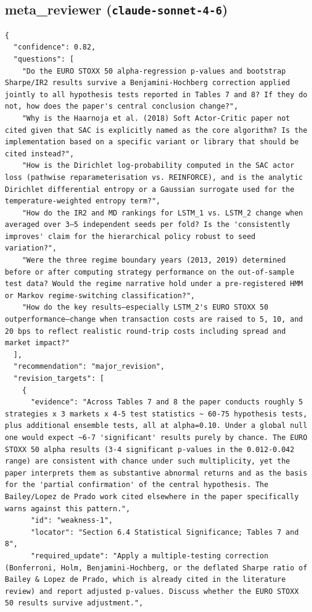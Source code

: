 \documentclass[11pt]{article}
\begin{document}
\subsection*{meta_reviewer (\texttt{claude-sonnet-4-6})}
\begin{verbatim}
{
  "confidence": 0.82,
  "questions": [
    "Do the EURO STOXX 50 alpha-regression p-values and bootstrap Sharpe/IR2 results survive a Benjamini-Hochberg correction applied jointly to all hypothesis tests reported in Tables 7 and 8? If they do not, how does the paper's central conclusion change?",
    "Why is the Haarnoja et al. (2018) Soft Actor-Critic paper not cited given that SAC is explicitly named as the core algorithm? Is the implementation based on a specific variant or library that should be cited instead?",
    "How is the Dirichlet log-probability computed in the SAC actor loss (pathwise reparameterisation vs. REINFORCE), and is the analytic Dirichlet differential entropy or a Gaussian surrogate used for the temperature-weighted entropy term?",
    "How do the IR2 and MD rankings for LSTM_1 vs. LSTM_2 change when averaged over 3–5 independent seeds per fold? Is the 'consistently improves' claim for the hierarchical policy robust to seed variation?",
    "Were the three regime boundary years (2013, 2019) determined before or after computing strategy performance on the out-of-sample test data? Would the regime narrative hold under a pre-registered HMM or Markov regime-switching classification?",
    "How do the key results—especially LSTM_2's EURO STOXX 50 outperformance—change when transaction costs are raised to 5, 10, and 20 bps to reflect realistic round-trip costs including spread and market impact?"
  ],
  "recommendation": "major_revision",
  "revision_targets": [
    {
      "evidence": "Across Tables 7 and 8 the paper conducts roughly 5 strategies x 3 markets x 4-5 test statistics ~ 60-75 hypothesis tests, plus additional ensemble tests, all at alpha=0.10. Under a global null one would expect ~6-7 'significant' results purely by chance. The EURO STOXX 50 alpha results (3-4 significant p-values in the 0.012-0.042 range) are consistent with chance under such multiplicity, yet the paper interprets them as substantive abnormal returns and as the basis for the 'partial confirmation' of the central hypothesis. The Bailey/Lopez de Prado work cited elsewhere in the paper specifically warns against this pattern.",
      "id": "weakness-1",
      "locator": "Section 6.4 Statistical Significance; Tables 7 and 8",
      "required_update": "Apply a multiple-testing correction (Bonferroni, Holm, Benjamini-Hochberg, or the deflated Sharpe ratio of Bailey & Lopez de Prado, which is already cited in the literature review) and report adjusted p-values. Discuss whether the EURO STOXX 50 results survive adjustment.",

\end{verbatim}
\end{document}
